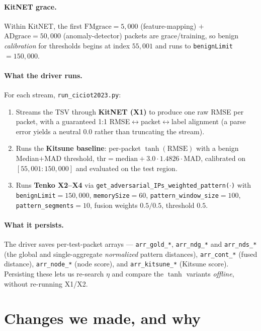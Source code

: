 \documentclass[11pt]{article}
\begin{document}
\paragraph{KitNET grace.} Within KitNET, the first $\text{FMgrace}=5{,}000$ (feature-mapping) $+$
$\text{ADgrace}=50{,}000$ (anomaly-detector) packets are grace/training, so benign \emph{calibration}
for thresholds begins at index $55{,}001$ and runs to \texttt{benignLimit} $=150{,}000$.

\paragraph{What the driver runs.} For each stream, \texttt{run\_ciciot2023.py}:
\begin{enumerate}
  \item Streams the TSV through \textbf{KitNET (X1)} to produce one raw RMSE per packet, with a
        guaranteed 1:1 RMSE$\leftrightarrow$packet$\leftrightarrow$label alignment (a parse error
        yields a neutral $0.0$ rather than truncating the stream).
  \item Runs the \textbf{Kitsune baseline}: per-packet $\tanh(\text{RMSE})$ with a benign
        Median$+$MAD threshold, $\text{thr}=\text{median}+3.0\cdot 1.4826\cdot\text{MAD}$, calibrated
        on $[55{,}001:150{,}000]$ and evaluated on the test region.
  \item Runs \textbf{Tenko X2--X4} via \texttt{get\_adversarial\_IPs\_weighted\_pattern($\cdot$)}
        with \texttt{benignLimit}$=150{,}000$, \texttt{memorySize}$=60$,
        \texttt{pattern\_window\_size}$=100$, \texttt{pattern\_segments}$=10$, fusion weights
        $0.5/0.5$, threshold $0.5$.
\end{enumerate}

\paragraph{What it persists.} The driver saves per-test-packet arrays --- \texttt{arr\_gold\_*},
\texttt{arr\_ndg\_*} and \texttt{arr\_nds\_*} (the global and single-aggregate \emph{normalized}
pattern distances), \texttt{arr\_cont\_*} (fused distance), \texttt{arr\_node\_*} (node score), and
\texttt{arr\_kitsune\_*} (Kitsune score). Persisting these lets us re-search $\eta$ and compare the
$\tanh$ variants \emph{offline}, without re-running X1/X2.

\section{Changes we made, and why}
\label{sec:changes}
\end{document}
